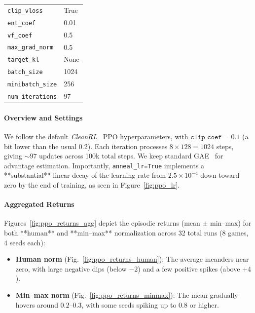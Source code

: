 \begin{table}[htbp]
\begin{tabular}{ll}
		\texttt{clip\_vloss}          & True \\
		\texttt{ent\_coef}            & 0.01 \\
		\texttt{vf\_coef}             & 0.5 \\
		\texttt{max\_grad\_norm}      & 0.5 \\
		\texttt{target\_kl}           & None \\
		\texttt{batch\_size}          & 1024 \\
		\texttt{minibatch\_size}      & 256 \\
		\texttt{num\_iterations}      & 97 \\
		\bottomrule
	\end{tabular}
\end{table}

\paragraph{Overview and Settings}
We follow the default \emph{CleanRL}~\cite{huang:cleanrl} PPO hyperparameters, 
with \(\texttt{clip\_coef}=0.1\) (a bit lower than the usual 0.2). 
Each iteration processes $8\times128=1024$ steps, giving $\sim97$ updates across 100k total steps. 
We keep standard GAE~\cite{schulman:gae} for advantage estimation. 
Importantly, \texttt{anneal\_lr=True} implements a **substantial** linear decay 
of the learning rate from $2.5\times 10^{-4}$ down toward zero by the end of training, 
as seen in Figure~\ref{fig:ppo_lr}.

\paragraph{Aggregated Returns}
Figures~\ref{fig:ppo_returns_agg} depict the episodic returns (mean $\pm$ min--max) 
for both **human** and **min--max** normalization across 32 total runs (8 games, 4 seeds each):
\begin{itemize}
	\item \textbf{Human norm} 
	(Fig.~\ref{fig:ppo_returns_human}): The average meanders near zero, with large 
	negative dips (below $-2$) and a few positive spikes (above $+4$).
	\item \textbf{Min--max norm}
	(Fig.~\ref{fig:ppo_returns_minmax}): The mean gradually hovers around $0.2$--$0.3$, 
	with some seeds spiking up to $0.8$ or higher.
\end{itemize}

